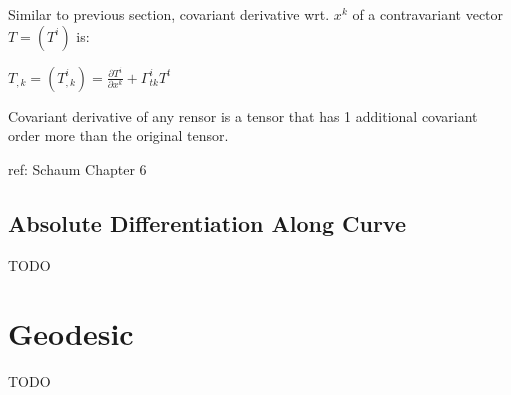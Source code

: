 \documentclass[8pt,letter]{article}
\begin{document}
\begin{multicols*}{2}
  Similar to previous section, covariant derivative wrt. $x^k$ of a contravariant vector $T=(T^i)$ is:

  $T_{,k} = (T_{,k}^i) = \frac{\partial T^i}{\partial x^k} + \Gamma_{tk}^i T^t$

  Covariant derivative of any rensor is a tensor that has 1 additional covariant order more than the original tensor.

  ref: Schaum Chapter 6

  \subsection{Absolute Differentiation Along Curve}
  TODO

  \vfill\null
  \pagebreak
    
  \section{Geodesic}

  TODO
  
\end{multicols*}
\end{document}
